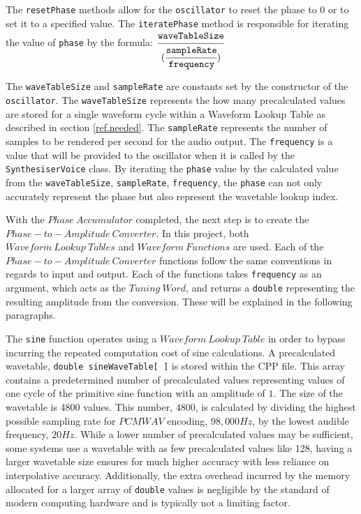 \documentclass[a4paper,12pt]{report}
\begin{document}
The \texttt{resetPhase} methods allow for the \texttt{oscillator} to reset the phase to $0$ or to set it to a specified value. The \texttt{iteratePhase} method is responsible for iterating the value of \texttt{phase} by the formula: \begin{math}
\cfrac{\texttt{waveTableSize}}{(\cfrac{\texttt{sampleRate}}{\texttt{frequency}})}
\end{math}

The \texttt{waveTableSize} and \texttt{sampleRate} are constants set by the constructor of the \texttt{oscillator}. The \texttt{waveTableSize} represents the how many precalculated values are stored for a single waveform cycle within a Waveform Lookup Table as described in section \ref{ref.needed}. The \texttt{sampleRate} represents the number of samples to be rendered per second for the audio output. The \texttt{frequency} is a value that will be provided to the oscillator when it is called by the \texttt{SynthesiserVoice} class. By iterating the \texttt{phase} value by the calculated value from the \texttt{waveTableSize}, \texttt{sampleRate}, \texttt{frequency}, the \texttt{phase} can not only accurately represent the phase but also represent the wavetable lookup index.

With the $Phase\ Accumulator$ completed, the next step is to create the $Phase-to-Amplitude\ Converter$. In this project, both $Waveform\ Lookup\ Tables$ and $Waveform\ Functions$ are used. Each of the $Phase-to-Amplitude\ Converter$ functions follow the same conventions in regards to input and output. Each of the functions takes \texttt{frequency} as an argument, which acts as the $Tuning\ Word$, and returns a \texttt{double} representing the resulting amplitude from the conversion. These will be explained in the following paragraphs.

The \texttt{sine} function operates using a $Waveform\ Lookup\ Table$ in order to bypass incurring the repeated computation cost of sine calculations. A precalculated wavetable, \texttt{double sineWaveTable[ ]} is stored within the CPP file. This array contains a predetermined number of precalculated values representing values of one cycle of the primitive sine function with an amplitude of $1$. The size of the wavetable is 4800 values. This number, $4800$, is calculated by dividing the highest possible sampling rate for $PCM WAV$ encoding, $98,000Hz$, by the lowest audible frequency, $20Hz$. While a lower number of precalculated values may be sufficient, some systems use a wavetable with as few precalculated values like 128, having a larger wavetable size ensures for much higher accuracy with less reliance on interpolative accuracy. Additionally, the extra overhead incurred by the memory allocated for a larger array of \texttt{double} values is negligible by the standard of modern computing hardware and is typically not a limiting factor.
\end{document}
